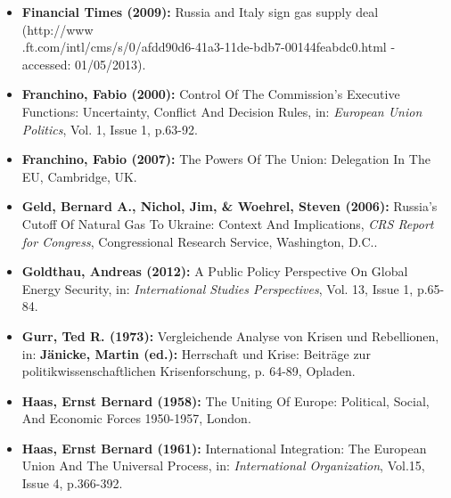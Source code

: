 \documentclass[11pt,a4paper,english]{scrreprt}
\begin{document}
\begin{itemize}
\item [\Rectsteel] \textbf{Financial Times (2009):} Russia and Italy sign gas
supply deal (\textcolor{dunkelgrau.80}{http://www\\
.ft.com/intl/cms/s/0/afdd90d6-41a3-11de-bdb7-00144feabdc0.html} - \\
accessed: 01/05/2013).



	\item [\Rectsteel] \textbf{Franchino, Fabio (2000):} Control Of The
Commission's Executive Functions: Uncertainty, Conflict And Decision Rules,
in: \textsl{European Union Politics}, Vol. 1, Issue 1, p.63-92.



	\item [\Rectsteel] \textbf{Franchino, Fabio (2007):} The Powers Of The
Union: Delegation In The EU, Cambridge, UK.



	\item [\Rectsteel] \textbf{Geld, Bernard A., Nichol, Jim, \&
Woehrel, Steven (2006):} Russia's Cutoff Of Natural Gas To Ukraine: Context And
Implications, \textsl{CRS Report for Congress}, Congressional Research Service,
Washington, D.C..



	\item [\Rectsteel] \textbf{Goldthau, Andreas (2012):} A Public Policy
Perspective On Global Energy Security, in: \textsl{International Studies
Perspectives}, Vol. 13, Issue 1, p.65-84.



	\item [\Rectsteel] \textbf{Gurr, Ted R. (1973):} Vergleichende
Analyse von Krisen und Rebellionen, in: \textbf{J\"anicke, Martin
(ed.):} Herrschaft und Krise: Beitr\"age zur politikwissenschaftlichen
Krisenforschung, p. 64-89, Opladen.



	\item [\Rectsteel] \textbf{Haas, Ernst Bernard (1958):} The Uniting Of
Europe: Political, Social, And Economic Forces 1950-1957, London.



	\item [\Rectsteel] \textbf{Haas, Ernst Bernard (1961):} International
Integration: The European Union And The Universal Process, in:
\textsl{International Organization}, Vol.15, Issue 4, p.366-392.




\end{itemize}
\end{document}
